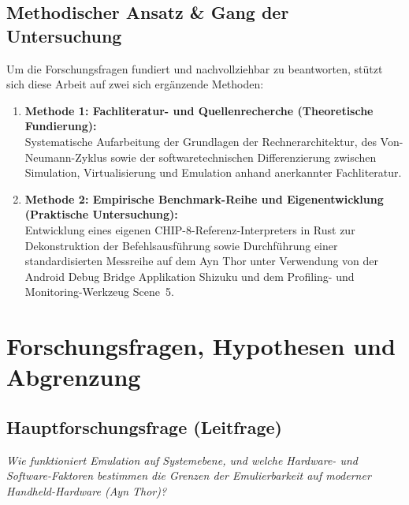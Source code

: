 \documentclass[12pt,a4paper]{scrartcl}
\begin{document}
\subsection{Methodischer Ansatz \& Gang der Untersuchung}
Um die Forschungsfragen fundiert und nachvollziehbar zu beantworten, stützt sich diese Arbeit auf zwei sich ergänzende Methoden:
\begin{enumerate}[leftmargin=1.8em]
    \item \textbf{Methode 1: Fachliteratur- und Quellenrecherche (Theoretische Fundierung):}\\
    Systematische Aufarbeitung der Grundlagen der Rechnerarchitektur, des Von-Neumann-Zyklus sowie der softwaretechnischen Differenzierung zwischen Simulation, Virtualisierung und Emulation anhand anerkannter Fachliteratur.
    \item \textbf{Methode 2: Empirische Benchmark-Reihe und Eigenentwicklung (Praktische Untersuchung):}\\
    Entwicklung eines eigenen CHIP-8-Referenz-Interpreters in Rust zur Dekonstruktion der Befehlsausführung sowie Durchführung einer standardisierten Messreihe auf dem Ayn Thor unter Verwendung von der Android Debug Bridge Applikation Shizuku und dem Profiling- und Monitoring-Werkzeug Scene~5.
\end{enumerate}

\newpage

\section{Forschungsfragen, Hypothesen und Abgrenzung}
\label{sec:forschungsfragen}

\subsection{Hauptforschungsfrage (Leitfrage)}
\textit{Wie funktioniert Emulation auf Systemebene, und welche Hardware- und Software-Faktoren bestimmen die Grenzen der Emulierbarkeit auf moderner Handheld-Hardware (Ayn Thor)?}
\end{document}
